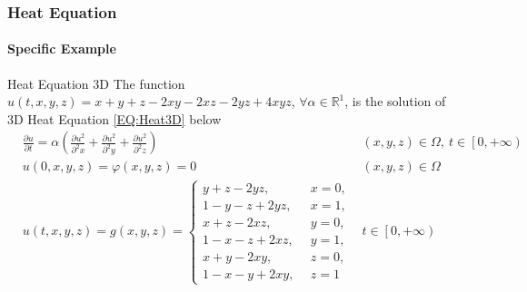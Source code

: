 \begin{frame}
  \frametitle{Heat Equation}
  \framesubtitle{Specific Example}
  \begin{block}{Heat Equation 3D}
    The function $u(t,x,y,z) = x + y + z - 2xy - 2xz - 2yz + 4xyz$, $\forall \alpha \in \mathbb{R}^1 $, is the solution of 3D Heat Equation \ref{EQ:Heat3D} below
    \begin{align}\label{EQ:Heat3D}
      &\frac{\partial u}{\partial t} = \alpha \left(
        \frac{\partial u^2}{\partial^2 x}
        +
        \frac{\partial u^2}{\partial^2 y}
        +
        \frac{\partial u^2}{\partial^2 z}
      \right) & (x,y, z) \in \Omega, \: t \in \left[0, +\infty\right) 
                                                                      \nonumber\\
      &u(0,x,y,z)  = \varphi(x,y,z) = 0 &(x,y,z) \in \Omega\\
      &  u(t,x,y,z) = g(x,y,z) = 
      \begin{cases}
        y+z -2yz        , \:\: &x=0,\\
        1 - y - z + 2yz , \:\: &x=1,\\
        x+z - 2xz       , \:\: &y=0,\\
        1 - x - z + 2xz , \:\: &y =1,\\
        x+y - 2xy       , \:\: &z=0,\\
        1 - x - y + 2xy , \:\: &z=1
      \end{cases}
      &t \in \left[0, +\infty\right) \nonumber
    \end{align}
  \end{block}
\end{frame}


